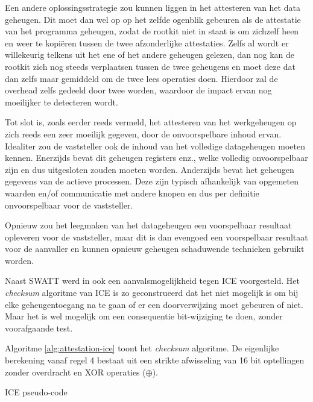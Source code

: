 Een andere oplossingsstrategie zou kunnen liggen in het attesteren van het data
geheugen. Dit moet dan wel op op het zelfde ogenblik gebeuren als de attestatie
van het programma geheugen, zodat de rootkit niet in staat is om zichzelf heen
en weer te kopi\"eren tussen de twee afzonderlijke attestaties. Zelfs al wordt
er willekeurig telkens uit het ene of het andere geheugen gelezen, dan nog kan
de rootkit zich nog steeds verplaatsen tussen de twee geheugens en moet deze
dat dan zelfs maar gemiddeld om de twee lees operaties doen. Hierdoor zal de
overhead zelfs gedeeld door twee worden, waardoor de impact ervan nog
moeilijker te detecteren wordt.

Tot slot is, zoals eerder reeds vermeld, het attesteren van het werkgeheugen op
zich reeds een zeer moeilijk gegeven, door de onvoorspelbare inhoud ervan.
Idealiter zou de vaststeller ook de inhoud van het volledige datageheugen
moeten kennen. Enerzijds bevat dit geheugen registers enz., welke volledig
onvoorspelbaar zijn en dus uitgesloten zouden moeten worden. Anderzijds bevat
het geheugen gegevens van de actieve processen. Deze zijn typisch afhankelijk
van opgemeten waarden en/of communicatie met andere knopen en dus per definitie
onvoorspelbaar voor de vaststeller.

Opnieuw zou het leegmaken van het datageheugen een voorspelbaar resultaat
opleveren voor de vaststeller, maar dit is dan evengoed een voorspelbaar
resultaat voor de aanvaller en kunnen opnieuw geheugen schaduwende technieken
gebruikt worden.

Naast SWATT werd in \citep{castelluccia2009difficulty} ook een
aanvalsmogelijkheid tegen ICE voorgesteld. Het \emph{checksum} algoritme van
ICE is zo geconstrueerd dat het niet mogelijk is om bij elke geheugentoegang na
te gaan of er een doorverwijzing moet gebeuren of niet. Maar het is wel
mogelijk om een consequentie bit-wijziging te doen, zonder voorafgaande test.

Algoritme \ref{alg:attestation-ice} toont het \emph{checksum} algoritme. De
eigenlijke berekening vanaf regel 4 bestaat uit een strikte afwisseling van
16 bit optellingen zonder overdracht en XOR operaties ($\oplus$).

\begin{algorithm}
\begin{algorithmic}[1]
     
     
       
      
        
  \EndFor
\end{algorithmic}
\caption{ICE pseudo-code\label{alg:attestation-ice}}
\end{algorithm}


